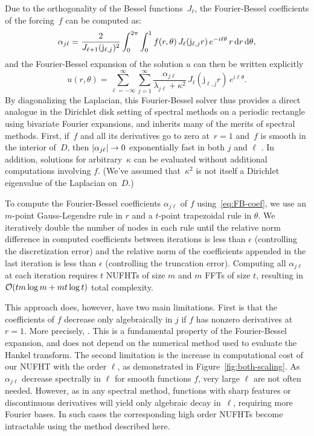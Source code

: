 Due to the orthogonality of the Bessel functions~$J_\ell$,
the Fourier-Bessel coefficients of the forcing~$f$ can be
computed as:
\begin{equation} \label{eq:FB-coef}
  \alpha_{j\ell} 
  = \frac{2}{J_{\ell+1}(\mathrm{j}_{\ell,j})^2} \int_0^{2\pi} \int_0^1
  f(r,\theta) \, J_\ell(\mathrm{j}_{\ell,j}r) \, e^{-i\ell\theta} \, r \dif{r} \dif{\theta},
\end{equation}
and the Fourier-Bessel expansion of the solution $u$ can then be written
explicitly
\begin{equation}
  u(r,\theta) = \sum_{\ell=-\infty}^\infty \sum_{j=1}^\infty
  \frac{\alpha_{j\ell}}{\lambda_{j\ell} + \kappa^2} \,
  J_\ell(\mathrm{j}_{\ell,j}r) \, e^{i\ell\theta}.
\end{equation}
By diagonalizing the Laplacian, this Fourier-Bessel solver thus provides a
direct analogue in the Dirichlet disk setting of spectral methods on a periodic
rectangle using bivariate Fourier expansions, and inherits many of the merits of
spectral methods. First, if~$f$ and all its derivatives go to zero at~$r=1$
and~$f$ is smooth in the interior of~$D$, then $\left|\alpha_{j\ell}\right| \to 0$
exponentially fast in both $j$ and $\ell$ \cite{boyd2011comparing}. In addition,
solutions for arbitrary~$\kappa$ can be evaluated without additional
computations involving $f$. (We've assumed that~$\kappa^2$ is not itself a
Dirichlet eigenvalue of the Laplacian on~$D$.)

To compute the Fourier-Bessel coefficients $\alpha_{j\ell}$ of $f$
using~\eqref{eq:FB-coef}, we use an $m$-point Gauss-Legendre rule in $r$ and a
$t$-point trapezoidal rule in $\theta$. We iteratively double the number of
nodes in each rule until the relative norm difference in computed coefficients
between iterations is less than $\epsilon$ (controlling the discretization
error) and the relative norm of the coefficients appended in the last iteration
is less than $\epsilon$ (controlling the truncation error). Computing all
$\alpha_{j\ell}$ at each iteration requires $t$ NUFHTs of size $m$ and $m$ FFTs
of size $t$, resulting in $\mathcal{O}(tm\log m + mt\log t)$ total complexity.

This approach does, however, have two main limitations. First is that the
coefficients of $f$ decrease only algebraically in $j$ if $f$ has nonzero
derivatives at~$r=1$. More precisely, .  This is a fundamental property of the
Fourier-Bessel expansion, and does not depend on the numerical method used to
evaluate the Hankel transform. The second limitation is the increase in
computational cost of our NUFHT with the order $\ell$, as demonstrated in
Figure~\ref{fig:both-scaling}. As $\alpha_{j\ell}$ decrease spectrally in $\ell$
for smooth functions $f$, very large $\ell$ are not often needed. However, as in
any spectral method, functions with sharp features or discontinuous derivatives
will yield only algebraic decay in~$\ell$, requiring more Fourier bases. In such
cases the corresponding high order NUFHTs become intractable using the method
described here. 

